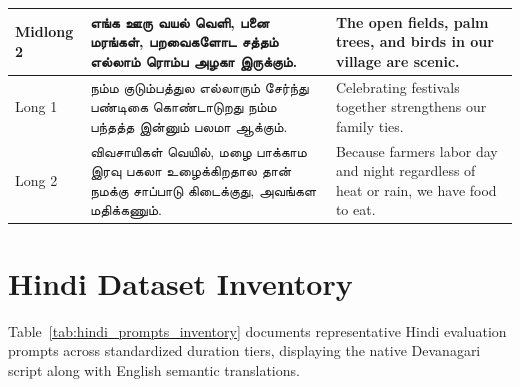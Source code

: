 \begin{table}[H]
{\begin{tabular}{l>{\tamilfont\raggedright\arraybackslash}p{8.5cm}>{\raggedright\arraybackslash}p{7.0cm}}
Midlong 2 & எங்க ஊரு வயல் வெளி, பனை மரங்கள், பறவைகளோட சத்தம் எல்லாம் ரொம்ப அழகா இருக்கும். & The open fields, palm trees, and birds in our village are scenic. \\
\midrule
Long 1 & நம்ம குடும்பத்துல எல்லாரும் சேர்ந்து பண்டிகை கொண்டாடுறது நம்ம பந்தத்த இன்னும் பலமா ஆக்கும். & Celebrating festivals together strengthens our family ties. \\
Long 2 & விவசாயிகள் வெயில், மழை பாக்காம இரவு பகலா உழைக்கிறதால தான் நமக்கு சாப்பாடு கிடைக்குது, அவங்கள மதிக்கணும். & Because farmers labor day and night regardless of heat or rain, we have food to eat. \\
\bottomrule
\end{tabular}%
}
\end{table}

\clearpage
\section{Hindi Dataset Inventory}
Table~\ref{tab:hindi_prompts_inventory} documents representative Hindi evaluation prompts across standardized duration tiers, displaying the native Devanagari script along with English semantic translations.

